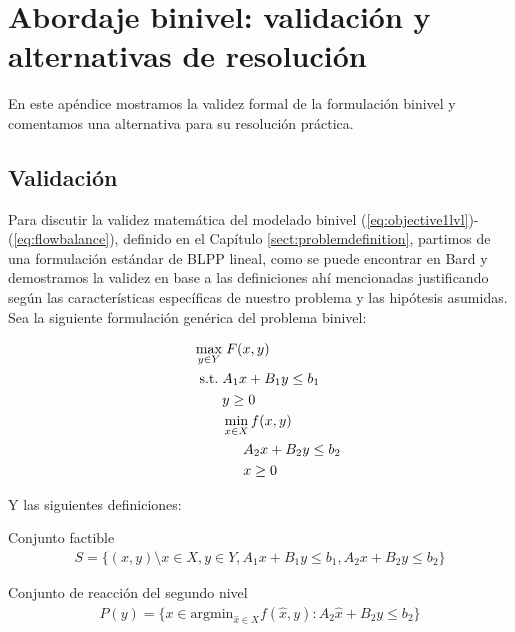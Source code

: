 \chapter{Abordaje binivel: validación y alternativas de resolución}
\label{sect:apendixbilevel}

En este apéndice mostramos la validez formal de la formulación binivel y comentamos una alternativa para su resolución práctica.

\section{Validación}
\label{sect:apendixbilevelvalidation}

Para discutir la validez matemática del modelado binivel (\ref{eq:objective1lvl})-(\ref{eq:flowbalance}), definido en el Capítulo \ref{sect:problemdefinition}, partimos de una formulación estándar de BLPP lineal, como se puede encontrar en Bard \textcite{bardbook} y demostramos la validez en base a las definiciones ahí mencionadas justificando según las características específicas de nuestro problema y las hipótesis asumidas. Sea la siguiente formulación genérica del problema binivel:

\begin{align}
\max_{y \in Y}            & \; F(x, y) \label{bilevelgeneric1} \\
\hspace{1.5em} \text{s.t.}\; & A_1 x + B_1 y \leq b_1 \\
                          & y \geq 0 \\
                          & \min_{x \in X} f(x, y) \\
                          & \hspace{1.5em} A_2 x + B_2 y \leq b_2 \label{bilevelgeneric5} \\
                          & \hspace{1.5em} x \geq 0 \label{bilevelgeneric6}
\end{align}

Y las siguientes definiciones:

\begin{definition}
Conjunto factible
\begin{align}
  S = \{(x, y) \setminus x \in X, y \in Y, A_1 x + B_1 y \leq b_1, A_2 x + B_2 y \leq b_2 \}
\end{align}
\end{definition}

\begin{definition}
Conjunto de reacción del segundo nivel
\begin{align}
  P(y) = \{ x \in \text{argmin}_{\hat{x} \in X} f(\hat{x}, y) : A_2 \hat{x} + B_2 y \leq b_2 \}
\end{align}
\end{definition}

